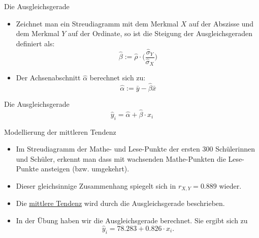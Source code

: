 \documentclass[usenames,dvipsnames,handout]{beamer}
\begin{document}


\begin{frame}{Die Ausgleichsgerade}
\begin{itemize}
\item{Zeichnet man ein Streudiagramm mit dem Merkmal $X$
auf der Abszisse und dem Merkmal $Y$ auf der Ordinate, so ist die
Steigung der Ausgleichsgeraden definiert als:
 \begin{equation}
 \label{def_beta}
 \hat{\beta}:=\hat{\rho}\cdot \bigg(\frac{\hat{\sigma}_{Y}}{\hat{\sigma}_{X}}\bigg)
 \end{equation}
}
 \item{Der Achsenabschnitt $\hat{\alpha}$ berechnet sich zu:
 \begin{equation}
 \label{def_alpha}
 \hat{\alpha}:=\bar{y}-\hat{\beta}\bar{x}
 \end{equation}
 }
\end{itemize}
\begin{block}{Die Ausgleichsgerade}
$$
\hat{y}_{i} = \hat{\alpha} + \hat{\beta} \cdot x_{i} 
$$
\end{block}
\end{frame}

\begin{frame}{Modellierung der mittleren Tendenz}
\begin{itemize}
\item{Im Streudiagramm der Mathe- und Lese-Punkte der ersten $300$ Schülerinnen und Schüler,
erkennt man dass mit wachsenden Mathe-Punkten die Lese-Punkte ansteigen (bzw. umgekehrt).}\pause
\item{Dieser gleichsinnige Zusammenhang spiegelt sich in $r_{X,Y}=0.889$ wieder.}\pause
\item{Die \underline{mittlere Tendenz} wird durch die Ausgleichsgerade beschrieben.}\pause
\item{In der Übung haben wir die Ausgleichsgerade berechnet.
Sie ergibt sich zu
$$
\hat{y}_{i} = 78.283 + 0.826 \cdot x_{i}.
$$
}
\end{itemize}
\end{frame}

\end{document}
